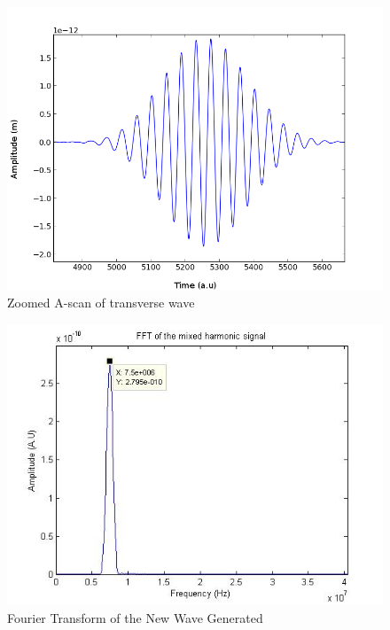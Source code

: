 \begin{figure}[ht]
\begin{center}
\includegraphics[scale=0.5]{images/chapter_3/final_transervse_zoom.png}
\caption{Zoomed A-scan of transverse wave}
\end{center}
\end{figure}


\begin{figure}
\begin{center}
\includegraphics[scale=0.5]{images/chapter_3/finaLfft_zzom.jpg}
\caption{Fourier Transform of the New Wave Generated}
\end{center}
\end{figure}

